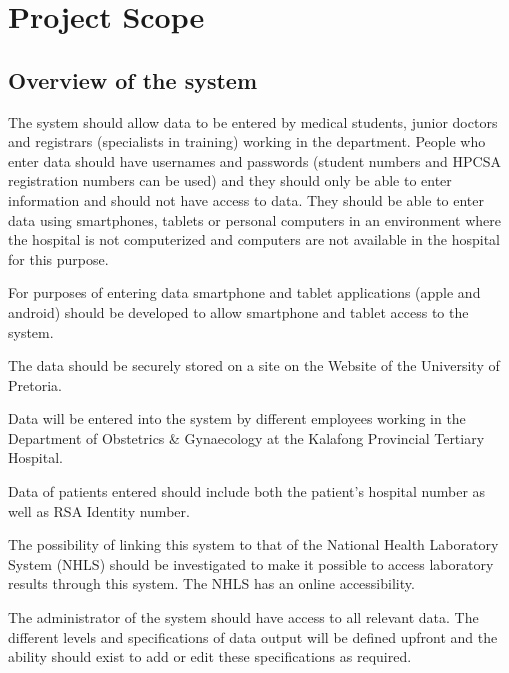 \section{Project Scope}

\subsection{Overview of the system} 
The system should allow data to be entered by medical students, junior doctors 
and  registrars  (specialists  in  training)  working  in  the  department.  People  who 
enter  data  should  have  usernames  and  passwords  (student  numbers  and 
HPCSA registration numbers can be used) and they should only be able to enter 
information  and  should  not  have  access  to  data.  They  should  be  able  to  enter 
data using smartphones, tablets or personal computers in an environment where 
the hospital is not computerized and computers are not available in the hospital 
for this purpose. \par 

For purposes  of  entering  data  smartphone and  tablet applications (apple  and 
android)  should be  developed  to  allow  smartphone  and  tablet  access  to  the 
system. \par

The data should be securely stored on a site on the Website of the University of 
Pretoria. \par

Data  will  be  entered  into  the  system  by  different  employees  working  in  the 
Department  of  Obstetrics  \&  Gynaecology  at  the  Kalafong  Provincial  Tertiary 
Hospital. \par

Data of patients entered should include both the patient’s hospital number as well 
as RSA Identity number. \par

The  possibility  of  linking  this  system  to  that  of  the  National  Health  Laboratory 
System (NHLS) should be investigated to make it possible to access laboratory 
results through this system. The NHLS has an online accessibility. \par

The  administrator  of  the  system  should  have  access  to  all  relevant  data.  The 
different levels and specifications of data output will be defined upfront and the 
ability should exist to add or edit these specifications as required. \par

